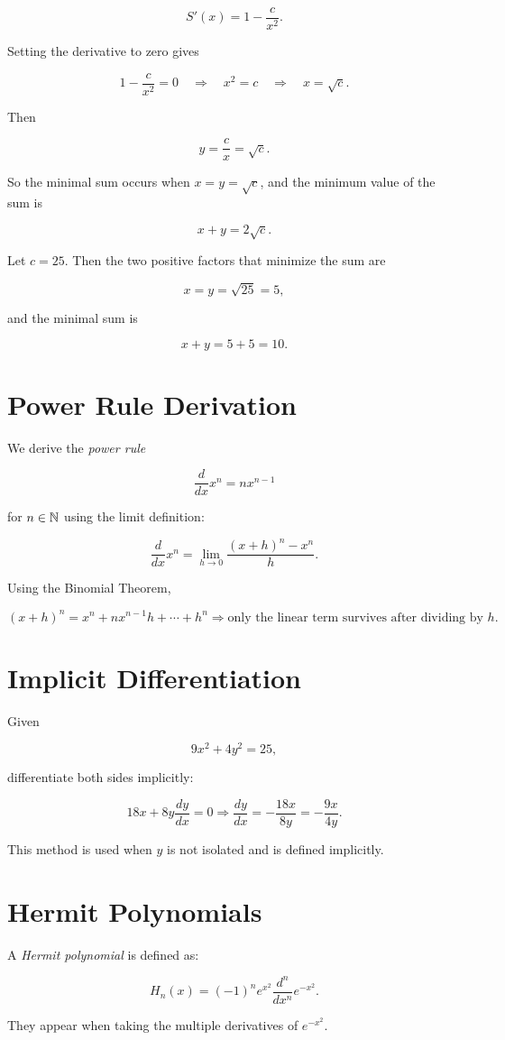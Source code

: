 \[
    S'(x) = 1 - \frac{c}{x^2}.
\]

Setting the derivative to zero gives

\[
    1 - \frac{c}{x^2} = 0 \quad \Rightarrow \quad x^2 = c \quad \Rightarrow \quad x = \sqrt{c}.
\]

Then

\[
    y = \frac{c}{x} = \sqrt{c}.
\]

So the minimal sum occurs when \( x = y = \sqrt{c} \), and the minimum value of the sum is

\[
    x + y = 2\sqrt{c}.
\]

Let \( c = 25 \). Then the two positive factors that minimize the sum are

\[
    x = y = \sqrt{25} = 5,
\]

and the minimal sum is

\[
    x + y = 5 + 5 = 10.
\]

\section{Power Rule Derivation}

We derive the \emph{power rule}

\[
    \frac{d}{dx} x^n = nx^{n - 1}
\]

for \(n \in \mathbb{N}\) using the limit definition:

\[
    \frac{d}{dx} x^n = \lim_{h \to 0} \frac{{(x + h)}^n - x^n}{h}.
\]

Using the Binomial Theorem,

\[
    {(x + h)}^n = x^n + nx^{n-1}h + \cdots + h^n
    \Rightarrow \text{only the linear term survives after dividing by } h.
\]

\section{Implicit Differentiation}

Given

\[
    9x^2 + 4y^2 = 25,
\]

differentiate both sides implicitly:

\[
    18x + 8y \frac{dy}{dx} = 0
    \Rightarrow \frac{dy}{dx} = -\frac{18x}{8y} = -\frac{9x}{4y}.
\]

This method is used when \(y\) is not isolated and is defined implicitly.

\section{Hermit Polynomials}

A \emph{Hermit polynomial} is defined as:

\[
    H_n(x) = (-1)^n e^{x^2} \frac{d^n}{d x^n} e^{-x^2}.
\]

They appear when taking the multiple derivatives of \(e^{-x^2}\).
